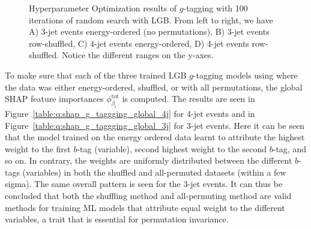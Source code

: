 \begin{figure}%
  \centering
  \;
  \vspace{2mm}
  \caption[Hyperparameter Optimization of $g$-tagging]{
    Hyperparameter Optimization results of $g$-tagging with \num{100} iterations of random search with LGB. From left to right, we have A) 3-jet events energy-ordered (no permutations), B) 3-jet events row-shuffled, C) 4-jet events energy-ordered, D) 4-jet events row-shuffled. Notice the different ranges on the y-axes.}
  \label{fig:q:CV_res_iterations_g_tagging}%
\end{figure}

To make sure that each of the three trained LGB $g$-tagging models using where the data was either energy-ordered, shuffled, or with all permutations, the global SHAP feature importances $\phi^\mathrm{tot}_{\beta_\mathrm{i}}$ is computed. The results are seen in Figure~\ref{table:q:shap_g_taggging_global_4j} for 4-jet events and in Figure~\ref{table:q:shap_g_taggging_global_3j} for 3-jet events. Here it can be seen that the model trained on the energy ordered data learnt to attribute the highest weight to the first $b$-tag (variable), second highest weight to the second $b$-tag, and so on. In contrary, the weights are uniformly distributed between the different $b$-tags (variables) in both the shuffled and all-permuted datasets (within a few sigma). The same overall pattern is seen for the 3-jet events. It can thus be concluded that both the shuffling method and all-permuting method are valid methods for training ML models that attribute equal weight to the different variables, a trait that is essential for permutation invariance. 

